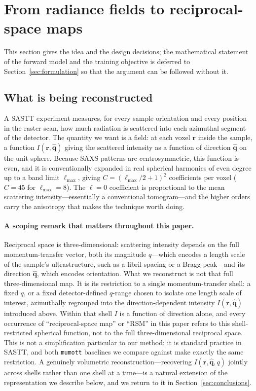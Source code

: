 \documentclass[11pt,a4paper]{article}
\newcommand{\ellmax}{\ell_{\mathrm{max}}}
\newcommand{\qvec}{\hat{\boldsymbol{q}}}
\newcommand{\rvec}{\boldsymbol{r}}
\begin{document}
\section{From radiance fields to reciprocal-space maps}
\label{sec:method}

This section gives the idea and the design decisions; the mathematical statement of the
forward model and the training objective is deferred to Section~\ref{sec:formulation} so
that the argument can be followed without it.

\subsection{What is being reconstructed}

A SASTT experiment measures, for every sample orientation and every position in the raster
scan, how much radiation is scattered into each azimuthal segment of the detector. The
quantity we want is a field: at each voxel $\rvec$ inside the sample, a function
$I(\rvec, \qvec)$ giving the scattered intensity as a function of direction $\qvec$ on
the unit sphere. Because SAXS patterns are centrosymmetric, this function is even, and it
is conventionally expanded in real spherical harmonics of even degree up to a band limit
$\ellmax$, giving $C=(\ellmax/2+1)^2$ coefficients per voxel ($C=45$ for $\ellmax=8$).
The $\ell=0$ coefficient is proportional to the mean scattering intensity---essentially a
conventional tomogram---and the higher orders carry the anisotropy that makes the
technique worth doing.

\paragraph{A scoping remark that matters throughout this paper.} Reciprocal space is
three-dimensional: scattering intensity depends on the full momentum-transfer vector, both
its magnitude $q$---which encodes a length scale of the sample's ultrastructure, such as a
fibril spacing or a Bragg peak---and its direction $\qvec$, which encodes orientation. What
we reconstruct is not that full three-dimensional map. It is its restriction to a single
momentum-transfer shell: a fixed $q$, or a fixed detector-defined $q$-range chosen to
isolate one length scale of interest, azimuthally regrouped into the direction-dependent
intensity $I(\rvec,\qvec)$ introduced above. Within that shell $I$ is a
function of direction alone, and every occurrence of ``reciprocal-space map'' or ``RSM'' in
this paper refers to this shell-restricted spherical function, not to the full
three-dimensional reciprocal space. This is not a simplification particular to our method:
it is standard practice in SASTT, and both \texttt{mumott} baselines we compare against make
exactly the same restriction. A genuinely volumetric reconstruction---recovering
$I(\rvec,\qvec,q)$ jointly across shells rather than one shell at a time---is a natural
extension of the representation we describe below, and we return to it in
Section~\ref{sec:conclusions}.
\end{document}
